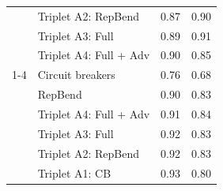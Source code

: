 \documentclass[11pt]{article}
\begin{document}
\begin{table}
\begin{tabular}{llrr}
 & Triplet A2: RepBend & 0.87 & 0.90 \\
 & Triplet A3: Full & 0.89 & 0.91 \\
 & Triplet A4: Full + Adv & 0.90 & 0.85 \\
\cline{1-4}
\multirow[t]{6}{*}{Random capitalization} & Circuit breakers & 0.76 & 0.68 \\
 & RepBend & 0.90 & 0.83 \\
 & Triplet A4: Full + Adv & 0.91 & 0.84 \\
 & Triplet A3: Full & 0.92 & 0.83 \\
 & Triplet A2: RepBend & 0.92 & 0.83 \\
 & Triplet A1: CB & 0.93 & 0.80 \\
\hline
\end{tabular}
\end{table}
\end{document}
